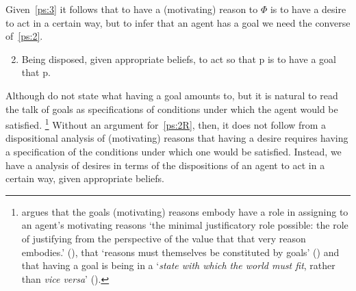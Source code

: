 \documentclass[10pt]{article}
\begin{document}
Given~\ref{ps:3} it follows that to have a (motivating) reason to \(\Phi\) is to have a desire to act in a certain way, but to infer that an agent has a goal we need the converse of~\ref{ps:2}.
\begin{enumerate}[label=\arabic*\('\)., ref=(\arabic*\('\))]\setcounter{enumi}{1}
\item\label{ps:2R} Being disposed, given appropriate beliefs, to act so that p is to have a goal that p.
\end{enumerate}
Although \citeauthor{Pettit:1990aa} do not state what having a goal amounts to, but it is natural to read the talk of goals as specifications of conditions under which the agent would be satisfied.\nolinebreak
\footnote{
  \citeauthor{Smith:1987aa} argues that the goals (motivating) reasons embody have a role in assigning to an agent's motivating reasons `the minimal justificatory role possible: the role of justifying from the perspective of the value that that very reason embodies.'  (\citeyear[38--39]{Smith:1987aa}), that `reasons must themselves be constituted by goals' (\citeyear[45]{Smith:1987aa}) and that having a goal is being in a `\emph{state with which the world must fit}, rather than \emph{vice versa}' (\citeyear[54]{Smith:1987aa}).
}
Without an argument for~\ref{ps:2R}, then, it does not follow from a dispositional analysis of (motivating) reasons that having a desire requires having a specification of the conditions under which one would be satisfied.
Instead, we have a analysis of desires in terms of the dispositions of an agent to act in a certain way, given appropriate beliefs.
\end{document}
